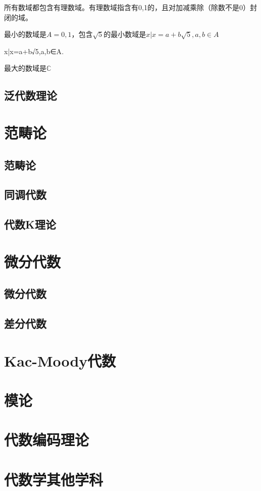 \documentclass[UTF8]{../09-Mathematics}
\begin{document}
所有数域都包含有理数域。有理数域指含有0,1的，且对加减乘除（除数不是0）封闭的域。

最小的数域是$A = {0,1}$，包含$\sqrt{5}$的最小数域是$ x| x = a + b\sqrt{5}, a , b \in A$

{x|x=a+b√5,a,b∈A}.


最大的数域是$\mathbb{C}$

\section{泛代数理论}




\chapter{范畴论}
    \section{范畴论}
    \section{同调代数}
    \section{代数K理论}

\chapter{微分代数}
    \section{微分代数}
    \section{差分代数}

\chapter{Kac-Moody代数}



\chapter{模论}

\chapter{代数编码理论}
\chapter{代数学其他学科}
\end{document}
